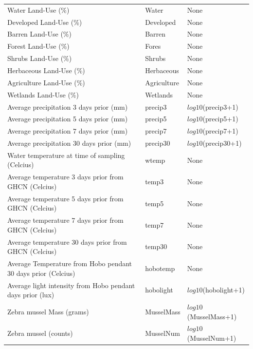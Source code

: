 \begin{longtable}{p{3.5cm}p{1cm}p{3.3cm}}
Water Land-Use (\%) & Water &  None \\ 
Developed Land-Use  (\%) & Developed & None \\ 
Barren Land-Use (\%) & Barren & None \\ 
Forest Land-Use (\%) & Fores & None \\ 
Shrubs Land-Use (\%) & Shrubs & None \\ 
Herbaceous Land-Use (\%) & Herbaceous  & None \\ 
Agriculture Land-Use (\%) & Agriculture & None \\ 
Wetlands Land-Use (\%) & Wetlands & None \\ 
Average precipitation 3 days prior (mm) & precip3 &  $log10$(precip3+1) \\ 
Average precipitation 5 days prior (mm)  & precip5 & $log10$(precip5+1) \\ 
Average precipitation 7 days prior (mm) & precip7 &  $log10$(precip7+1) \\ 
Average precipitation 30 days prior (mm) & precip30 &  $log10$(precip30+1) \\ 
Water temperature at time of sampling (Celcius) & wtemp & None \\ 
Average temperature 3 days prior from GHCN (Celcius) & temp3&  None \\ 
Average temperature 5 days prior from GHCN (Celcius) & temp5 & None \\ 
Average temperature 7 days prior  from GHCN (Celcius) &  temp7 & None \\ 
Average temperature 30 days prior from GHCN (Celcius) & temp30 &  None \\ 
Average Temperature from Hobo pendant 30 days prior (Celcius) & hobotemp & None \\ 
Average light intensity from Hobo pendant days prior (lux) & hobolight & $log10$(hobolight+1) \\ 
Zebra mussel Mass (grams) & MusselMass &  $log10$(MusselMass+1) \\ 
Zebra mussel (counts) &  MusselNum & $log10$(MusselNum+1) \\ 
\hline
\end{longtable}

